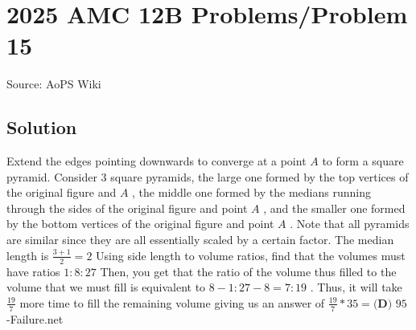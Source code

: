 \documentclass[12pt]{article}
\begin{document}
\section*{{2025 AMC 12B Problems/Problem 15}}
Source: AoPS Wiki

\subsection*{Solution}
Extend the edges pointing downwards to converge at a point $A$ to form a square pyramid. Consider 3 square pyramids, the large one formed by the top vertices of the original figure and $A$ , the middle one formed by the medians running through the sides of the original figure and point $A$ , and the smaller one formed by the bottom vertices of the original figure and point $A$ . Note that all pyramids are similar since they are all essentially scaled by a certain factor. The median length is $\frac{3+1}{2}=2$ Using side length to volume ratios, find that the volumes must have ratios $1:8:27$ Then, you get that the ratio of the volume thus filled to the volume that we must fill is equivalent to $8-1:27-8 = 7:19$ .
Thus, it will take $\frac{19}{7}$ more time to fill the remaining volume giving us an answer of $\frac{19}{7} * 35 = \boxed{\textbf{(D) }95}$ -Failure.net
\end{document}
